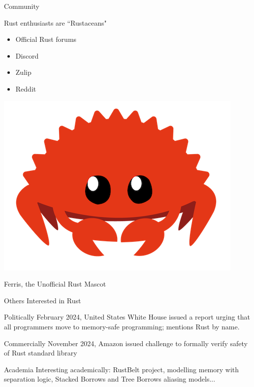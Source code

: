 \documentclass{beamer}
\begin{document}
\begin{frame}{Community} 
\begin{block}{Rust enthusiasts are ``Rustaceans"}
\begin{itemize}[label=$\bullet$] 
\item Official Rust forums
\item Discord
\item Zulip
\item Reddit
\end{itemize}
\end{block}
\begin{center}
\includegraphics[scale=0.1]{cuddlyferris}

Ferris, the Unofficial Rust Mascot
\end{center}
\end{frame}


\begin{frame}{Others Interested in Rust}
\begin{block}{Politically} 
February 2024, United States White House issued a report urging that all programmers move to memory-safe programming; mentions Rust by name.
\end{block} 
\begin{block}{Commercially} 
November 2024, Amazon issued challenge to formally verify safety of Rust standard library
\end{block}
\begin{block}{Academia} 
Interesting academically: RustBelt project, modelling memory with separation logic, 
Stacked Borrows and Tree Borrows aliasing models...
\end{block} 
\end{frame} 
\end{document}
